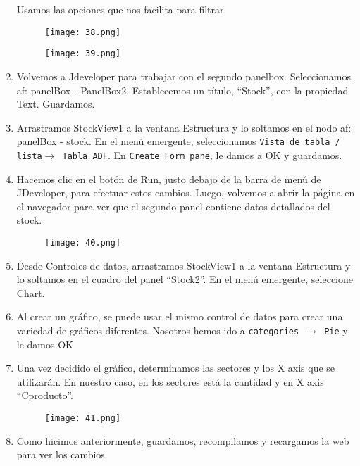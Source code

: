 \begin{enumerate}
	Usamos las opciones que nos facilita para filtrar
	\begin{figure}[!h]
	  \centering
	    \texttt{[image: 38.png]}
	\end{figure}
	\pagebreak
	\begin{figure}[!h]
	  \centering
	    \texttt{[image: 39.png]}
	\end{figure}
	\item Volvemos a Jdeveloper para trabajar con el segundo panelbox. Seleccionamos af: panelBox - PanelBox2. Establecemos un título, ``Stock'', con la propiedad Text. Guardamos.
	\item Arrastramos StockView1 a la ventana Estructura y lo soltamos en el nodo af: panelBox - stock. En el menú emergente, seleccionamos \texttt{Vista de tabla / lista$\rightarrow$ Tabla ADF}. En \texttt{Create Form pane}, le damos a OK y guardamos.
	\item Hacemos clic en el botón de Run, justo debajo de la barra de menú de JDeveloper, para efectuar estos cambios. Luego, volvemos a abrir la página en el navegador para ver que el segundo panel contiene datos detallados del stock.
	\begin{figure}[!h]
	  \centering
	    \texttt{[image: 40.png]}
	\end{figure}
	\pagebreak
	\item Desde Controles de datos, arrastramos StockView1 a la ventana Estructura y lo soltamos en el cuadro del panel ``Stock2''. En el menú emergente, seleccione Chart.
	\item Al crear un gráfico, se puede usar el mismo control de datos para crear una variedad de gráficos diferentes. Nosotros hemos ido a \texttt{categories $\rightarrow$ Pie} y le damos OK
	\item Una vez decidido el gráfico, determinamos las sectores y los X axis que se utilizarán. En nuestro caso, en los sectores está la cantidad y en X axis ``Cproducto''.
	\begin{figure}[!h]
	  \centering
	    \texttt{[image: 41.png]}
	\end{figure}
	\item Como hicimos anteriormente, guardamos, recompilamos y recargamos la web para ver los cambios.
\end{enumerate}

